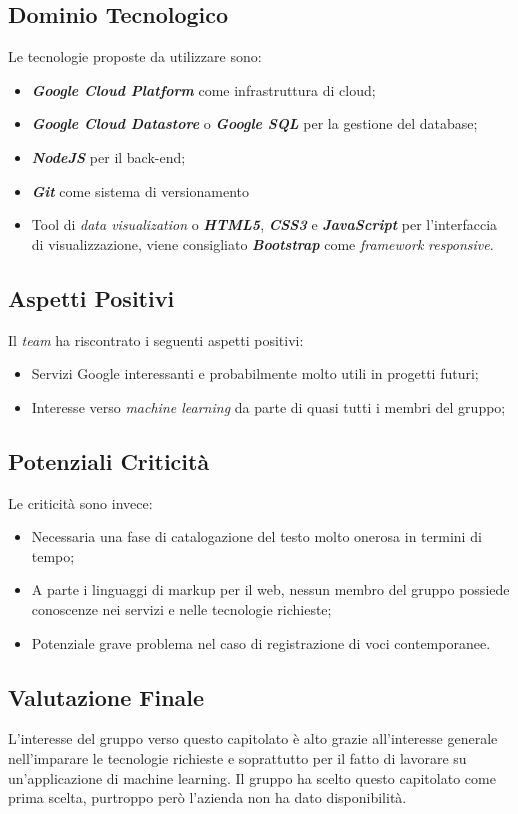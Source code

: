 \subsection{Dominio Tecnologico}
Le tecnologie proposte da utilizzare sono:
\begin{itemize}
	\item \textit{\textbf{Google Cloud Platform}} come infrastruttura di cloud;
	\item \textbf{\textit{Google Cloud Datastore}} o \textbf{\textit{Google SQL}} per la gestione del database;
	\item \textbf{\textit{NodeJS}} per il back-end;
	\item \textbf{\textit{Git}} come sistema di versionamento
	\item Tool di \textit{data visualization} o \textbf{\textit{HTML5}}, \textbf{\textit{CSS3}} e \textbf{\textit{JavaScript}} per l'interfaccia di visualizzazione, viene consigliato \textbf{\textit{Bootstrap}} come \textit{framework} \textit{responsive}.
\end{itemize}

\subsection{Aspetti Positivi}
Il \textit{team} ha riscontrato i seguenti aspetti positivi:
\begin{itemize}
	\item Servizi Google interessanti e probabilmente molto utili in progetti futuri;
	\item Interesse verso \textit{machine learning} da parte di quasi tutti i membri del gruppo;
\end{itemize}

\subsection{Potenziali Criticità}
Le criticità sono invece:
\begin{itemize}
	\item Necessaria una fase di catalogazione del testo molto onerosa in termini di tempo;
	\item A parte i linguaggi di markup per il web, nessun membro del gruppo possiede conoscenze nei servizi e nelle tecnologie richieste;
	\item Potenziale grave problema nel caso di registrazione di voci contemporanee.
\end{itemize}

\subsection{Valutazione Finale}
L'interesse del gruppo verso questo capitolato è alto grazie all'interesse generale nell'imparare le tecnologie richieste e soprattutto per il fatto di lavorare su un'applicazione di machine learning.
Il gruppo ha scelto questo capitolato come prima scelta, purtroppo però l'azienda non ha dato disponibilità.